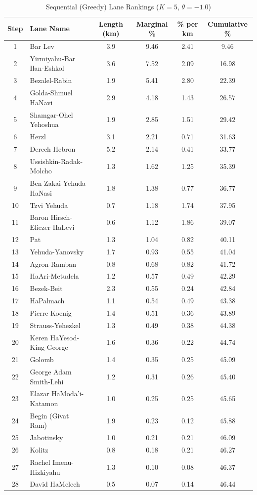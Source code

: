 \begin{table}[H]
\centering
\caption{Sequential (Greedy) Lane Rankings ($K=5$, $\theta=-1.0$)}
\label{tab:sequential_rankings}
\small
\begin{tabular}{@{}clcccc@{}}
\toprule
\textbf{Step} & \textbf{Lane Name} & \textbf{Length (km)} & \textbf{Marginal \%} & \textbf{\% per km} & \textbf{Cumulative \%} \\
\midrule
1 & Bar Lev & 3.9 & 9.46 & 2.41 & 9.46 \\
2 & Yirmiyahu-Bar Ilan-Eshkol & 3.6 & 7.52 & 2.09 & 16.98 \\
3 & Bezalel-Rabin & 1.9 & 5.41 & 2.80 & 22.39 \\
4 & Golda-Shmuel HaNavi & 2.9 & 4.18 & 1.43 & 26.57 \\
5 & Shamgar-Ohel Yehoshua & 1.9 & 2.85 & 1.51 & 29.42 \\
6 & Herzl & 3.1 & 2.21 & 0.71 & 31.63 \\
7 & Derech Hebron & 5.2 & 2.14 & 0.41 & 33.77 \\
8 & Ussishkin-Radak-Molcho & 1.3 & 1.62 & 1.25 & 35.39 \\
9 & Ben Zakai-Yehuda HaNasi & 1.8 & 1.38 & 0.77 & 36.77 \\
10 & Tzvi Yehuda & 0.7 & 1.18 & 1.74 & 37.95 \\
11 & Baron Hirsch-Eliezer HaLevi & 0.6 & 1.12 & 1.86 & 39.07 \\
12 & Pat & 1.3 & 1.04 & 0.82 & 40.11 \\
13 & Yehuda-Yanovsky & 1.7 & 0.93 & 0.55 & 41.04 \\
14 & Agron-Ramban & 0.8 & 0.68 & 0.82 & 41.72 \\
15 & HaAri-Metudela & 1.2 & 0.57 & 0.49 & 42.29 \\
16 & Bezek-Beit & 2.3 & 0.55 & 0.24 & 42.84 \\
17 & HaPalmach & 1.1 & 0.54 & 0.49 & 43.38 \\
18 & Pierre Koenig & 1.4 & 0.51 & 0.36 & 43.89 \\
19 & Strauss-Yehezkel & 1.3 & 0.49 & 0.38 & 44.38 \\
20 & Keren HaYesod-King George & 1.6 & 0.36 & 0.22 & 44.74 \\
21 & Golomb & 1.4 & 0.35 & 0.25 & 45.09 \\
22 & George Adam Smith-Lehi & 1.2 & 0.31 & 0.26 & 45.40 \\
23 & Elazar HaModa'i-Katamon & 1.0 & 0.25 & 0.25 & 45.65 \\
24 & Begin (Givat Ram) & 1.9 & 0.23 & 0.12 & 45.88 \\
25 & Jabotinsky & 1.0 & 0.21 & 0.21 & 46.09 \\
26 & Kolitz & 0.8 & 0.18 & 0.21 & 46.27 \\
27 & Rachel Imenu-Hizkiyahu & 1.3 & 0.10 & 0.08 & 46.37 \\
28 & David HaMelech & 0.5 & 0.07 & 0.14 & 46.44 \\
\bottomrule
\end{tabular}
\end{table}
